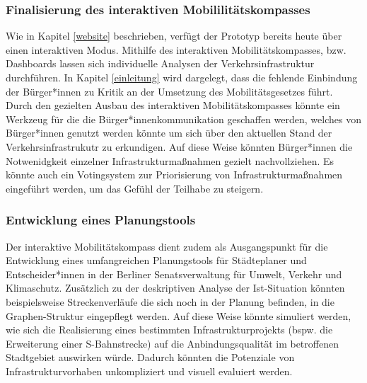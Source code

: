
\subsubsection{Finalisierung des interaktiven Mobililitätskompasses}
Wie in Kapitel \ref{website} beschrieben, verfügt der Prototyp bereits heute über einen interaktiven Modus. Mithilfe des interaktiven Mobilitätskompasses, bzw. Dashboards lassen sich individuelle Analysen der Verkehrsinfrastruktur durchführen. In Kapitel \ref{einleitung} wird dargelegt, dass die fehlende Einbindung der Bürger*innen zu Kritik an der Umsetzung des Mobilitätsgesetzes führt. Durch den gezielten Ausbau des interaktiven Mobilitätskompasses könnte ein Werkzeug für die die Bürger*innenkommunikation geschaffen werden, welches von Bürger*innen genutzt werden könnte um sich über den aktuellen Stand der Verkehrsinfrastrukutr zu erkundigen. Auf diese Weise könnten Bürger*innen die Notwenidgkeit einzelner Infrastrukturmaßnahmen gezielt nachvollziehen. Es könnte auch ein Votingsystem zur Priorisierung von Infrastrukturmaßnahmen eingeführt werden, um das Gefühl der Teilhabe zu steigern.



\subsubsection{Entwicklung eines Planungstools}
Der interaktive Mobilitätskompass dient zudem als Ausgangspunkt für die Entwicklung eines umfangreichen Planungstools für Städteplaner und Entscheider*innen in der Berliner Senatsverwaltung für Umwelt, Verkehr und Klimaschutz. Zusätzlich zu der deskriptiven Analyse der Ist-Situation könnten beispielsweise Streckenverläufe die sich noch in der Planung befinden, in die Graphen-Struktur eingepflegt werden. Auf diese Weise könnte simuliert werden, wie sich die Realisierung eines bestimmten Infrastrukturprojekts (bspw. die Erweiterung einer S-Bahnstrecke) auf die Anbindungsqualität im betroffenen Stadtgebiet auswirken würde. Dadurch könnten die Potenziale von Infrastrukturvorhaben unkompliziert und visuell evaluiert werden.


